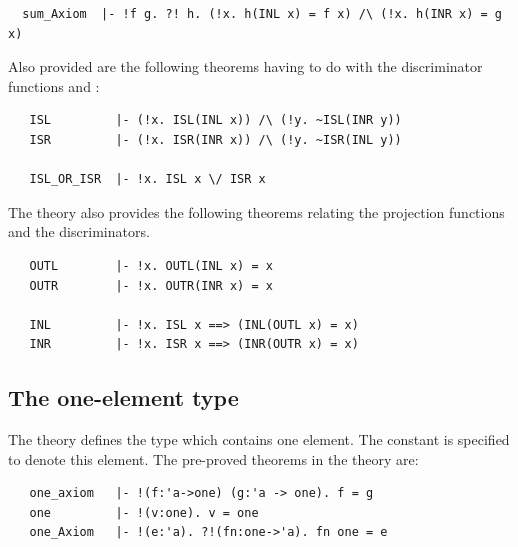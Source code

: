 \begin{hol}
\begin{verbatim}
  sum_Axiom  |- !f g. ?! h. (!x. h(INL x) = f x) /\ (!x. h(INR x) = g x)
\end{verbatim}
\end{hol}

\noindent Also provided are the following theorems having to
do with the discriminator functions  and :

\begin{hol}
\begin{verbatim}
   ISL         |- (!x. ISL(INL x)) /\ (!y. ~ISL(INR y))
   ISR         |- (!x. ISR(INR x)) /\ (!y. ~ISR(INL y))

   ISL_OR_ISR  |- !x. ISL x \/ ISR x
\end{verbatim}
\end{hol}

\noindent The  theory also provides the following theorems
relating the projection functions and the discriminators.

\begin{hol}
\begin{verbatim}
   OUTL        |- !x. OUTL(INL x) = x
   OUTR        |- !x. OUTR(INR x) = x

   INL         |- !x. ISL x ==> (INL(OUTL x) = x)
   INR         |- !x. ISR x ==> (INR(OUTR x) = x)
\end{verbatim}
\end{hol}



\subsection{The one-element type}%
%

The theory  defines  the type   which  contains one element.
The constant    is specified  to denote  this element.   The pre-proved
theorems in the theory  are:

\begin{hol}
\begin{verbatim}
   one_axiom   |- !(f:'a->one) (g:'a -> one). f = g
   one         |- !(v:one). v = one
   one_Axiom   |- !(e:'a). ?!(fn:one->'a). fn one = e
\end{verbatim}
\end{hol}

